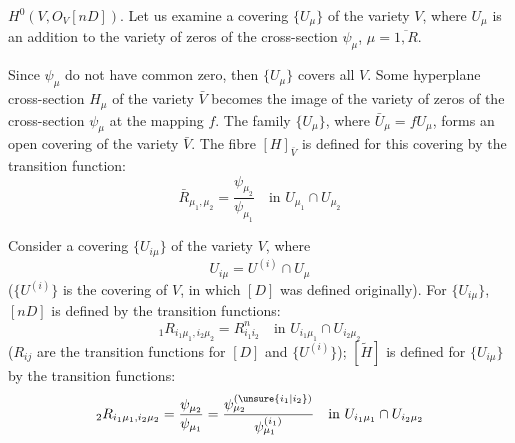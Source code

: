 
$H^0(V,O_V[nD])$. Let us examine a covering $\{U_\mu\}$ of the variety $V$, where $U_\mu$ is an addition to the variety of zeros of the cross-section $\psi_\mu$, $\mu=\overline{1,R}$.

Since $\psi_\mu$ do not have common zero, then $\{U_\mu\}$ covers all $V$. Some hyperplane cross-section $H_\mu$ of the variety $\bar V$ becomes the image of the variety of zeros of the cross-section $\psi_\mu$ at the mapping $f$. The family $\{U_\mu\}$, where $\bar U_\mu=fU_\mu$, forms an open covering of the variety $\bar V$. The fibre $[H]_{\bar V}$ is defined for this covering by the transition function:
\[
\bar R_{\mu_1,\mu_2}=\frac{\psi_{\mu_2}}{\psi_{\mu_1}}\quad\text{in }U_{\mu_1}\cap U_{\mu_2}
\]

Consider a covering $\{U_{i\mu}\}$ of the variety $V$, where
\[
U_{i\mu}=U^{(i)}\cap U_\mu
\]
($\{U^{(i)}\}$ is the covering of $V$, in which $[D]$ was defined originally). For $\{U_{i\mu}\}$, $[nD]$ is defined by the transition functions:
\[
{}_1R_{i_1\mu_1,i_2\mu_2}=R^n_{i_1i_2}\quad\text{in }U_{i_1\mu_1}\cap U_{i_2\mu_2}
\]
($R_{ij}$ are the transition functions for $[D]$ and $\{U^{(i)}\}$); $[\widetilde H]$ is defined for $\{U_{i\mu}\}$ by the transition functions:
\[
{}_2R_{i_1\mu_1,i_2\mu_2}=\frac{\psi_{\mu_2}}{\psi_{\mu_1}}=\frac{\psi^{(\unsure{i_1|i_2})}_{\mu_2}}{\psi^{(i_1)}_{\mu_1}}\quad\text{in }U_{i_1\mu_1}\cap U_{i_2\mu_2}
\]

